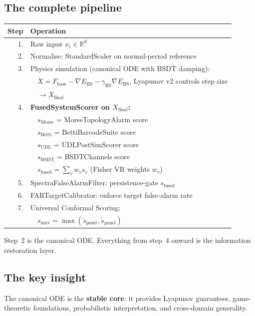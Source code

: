 \documentclass[11pt,a4paper]{article}
\theoremstyle{definition}
\begin{document}
\subsection{The complete pipeline}

\begin{center}
\renewcommand{\arraystretch}{1.3}
\begin{tabular}{rl}
\toprule
\textbf{Step} & \textbf{Operation} \\
\midrule
1. & Raw input $x_i \in \mathbb{R}^d$ \\
2. & Normalise: StandardScaler on normal-period reference \\
3. & Physics simulation (canonical ODE with BSDT damping): \\
   & $\quad \dot X = F_\text{base} - \nabla E_\text{BS} - \gamma_\text{BS}\nabla E_\text{BS}$,
     Lyapunov v2 controls step size \\
   & $\quad \to X_\text{final}$ \\
4. & \textbf{FusedSystemScorer on $X_\text{final}$:} \\
   & $\quad s_\text{Morse}$ = MorseTopologyAlarm score \\
   & $\quad s_\text{Betti}$ = BettiBarcodeSuite score \\
   & $\quad s_\text{UDL}$ = UDLPostSimScorer score \\
   & $\quad s_\text{BSDT}$ = BSDTChannels score \\
   & $\quad s_\text{fused} = \sum_v w_v s_v$ \quad (Fisher VR weights $w_v$) \\
5. & SpectraFalseAlarmFilter: persistence-gate $s_\text{fused}$ \\
6. & FARTargetCalibrator: enforce target false-alarm rate \\
7. & Universal Conformal Scoring: \\
   & $\quad s_\text{univ} = \max(\tilde s_\text{point}, \tilde s_\text{panel})$ \\
\bottomrule
\end{tabular}
\end{center}

\noindent
Step~2 is the canonical ODE.
Everything from step~4 onward is the information restoration layer.

\subsection{The key insight}

The canonical ODE is the \textbf{stable core}: it provides Lyapunov guarantees,
game-theoretic foundations, probabilistic interpretation, and cross-domain
generality.
\end{document}
